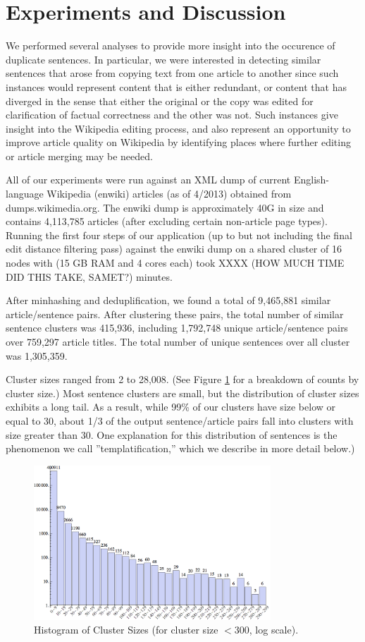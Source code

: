 \documentclass{acm_proc_article-sp}
\begin{document}
\section{Experiments and Discussion}

We performed several analyses to provide more insight into the occurence of duplicate sentences. In particular, we were interested in detecting similar sentences that arose from copying text from one article to another since such instances would represent content that is either redundant, or content that has diverged in the sense that either the original or the copy was edited for clarification of factual correctness and the other was not. Such instances give insight into the Wikipedia editing process, and also represent an opportunity to improve article quality on Wikipedia by identifying places where further editing or article merging may be needed.

All of our experiments were run against an XML dump of current English-language Wikipedia (enwiki) articles (as of 4/2013) obtained from dumps.wikimedia.org. The enwiki dump is approximately 40G in size and contains 4,113,785 articles (after excluding certain non-article page types). Running the first four steps of our application (up to but not including the final edit distance filtering pass) against the enwiki dump on a shared cluster of 16 nodes with (15 GB RAM and 4 cores each) took XXXX (HOW MUCH TIME DID THIS TAKE, SAMET?) minutes.

After minhashing and deduplification, we found a total of 9,465,881 similar article/sentence pairs. After clustering these pairs, the total number of similar sentence clusters was 415,936, including 1,792,748 unique article/sentence pairs over 759,297 article titles. The total number of unique sentences over all cluster was 1,305,359.

Cluster sizes ranged from 2 to 28,008. (See Figure \ref{clust} for a breakdown of counts by cluster size.) Most sentence clusters are small, but the distribution of cluster sizes exhibits a long tail. As a result, while 99\% of our clusters have size below or equal to 30, about 1/3 of the output sentence/article pairs fall into clusters with size greater than 30. One explanation for this distribution of sentences is the phenomenon we call ''templatification,'' which we describe in more detail below.)

\begin{figure}
\centering
\includegraphics[width=3.5in, keepaspectratio = true]{clusterhistogram.png}
\caption{Histogram of Cluster Sizes (for cluster size $< 300$, log scale).}
\label{clust}
\end{figure}
\end{document}
